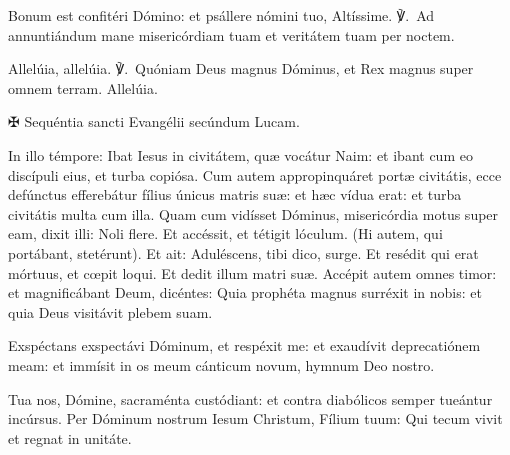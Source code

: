 \label{gradual}
Bonum est confitéri Dómino: et psállere nómini tuo, Altíssime. ℣.~Ad
annuntiándum mane misericórdiam tuam et veritátem tuam per noctem.
\finishfulltextelement

\label{alleluia}
Allelúia, allelúia. ℣.~Quóniam Deus magnus Dóminus, et Rex magnus super
omnem terram. Allelúia.
\finishfulltextelement
{}

\label{gospel}
✠ Sequéntia sancti Evangélii secúndum Lucam.

In illo témpore: Ibat Iesus in civitátem, quæ vocátur Naim: et ibant cum eo
discípuli eius, et turba copiósa. Cum autem appropinquáret portæ civitátis,
ecce defúnctus efferebátur fílius únicus matris suæ: et hæc vídua erat: et
turba civitátis multa cum illa. Quam cum vidísset Dóminus, misericórdia motus
super eam, dixit illi: Noli flere. Et accéssit, et tétigit lóculum. (Hi
autem, qui portábant, stetérunt). Et ait: Aduléscens, tibi dico, surge. Et
resédit qui erat mórtuus, et cœpit loqui. Et dedit illum matri suæ. Accépit
autem omnes timor: et magnificábant Deum, dicéntes: Quia prophéta magnus
surréxit in nobis: et quia Deus visitávit plebem suam.
\finishfulltextelement
\par\smallskip{}

\label{offertory}
Exspéctans exspectávi Dóminum, et respéxit me: et exaudívit deprecatiónem
meam: et immísit in os meum cánticum novum, hymnum Deo nostro.
\finishfulltextelement
{}

\label{secret}
Tua nos, Dómine, sacraménta custódiant: et contra diabólicos semper tueántur
incúrsus. Per Dóminum nostrum Iesum Christum, Fílium tuum: Qui tecum vivit
et regnat in unitáte.

